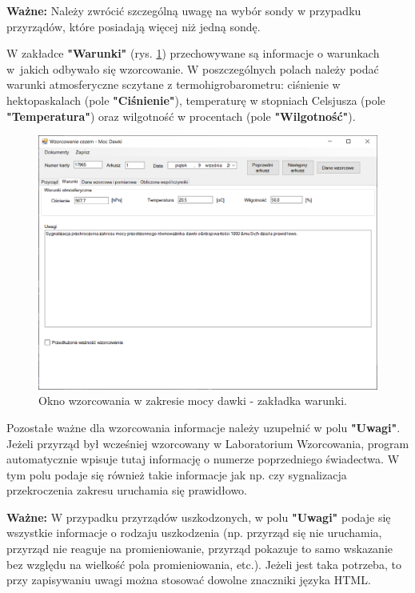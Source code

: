 \textbf{Ważne:} Należy zwrócić szczególną uwagę na wybór sondy w przypadku przyrządów, które posiadają więcej niż jedną sondę.

W zakładce \textbf{"Warunki"} (rys. \ref{mocWarunki}) przechowywane są informacje o warunkach w~jakich odbywało się wzorcowanie. W poszczególnych polach należy podać warunki atmosferyczne sczytane z termohigrobarometru: ciśnienie w hektopaskalach (pole \textbf{"Ciśnienie"}), temperaturę w stopniach Celsjusza (pole \textbf{"Temperatura"}) oraz wilgotność w procentach (pole \textbf{"Wilgotność"}).

\begin{figure}[htb]
	\centering
	\includegraphics[width=\columnwidth]{obrazki/Wzorcowanie/moc_dawki/warunki.png}
	\caption{Okno wzorcowania w zakresie mocy dawki - zakładka warunki.}
	\label{mocWarunki}
\end{figure}

Pozostałe ważne dla wzorcowania informacje należy uzupełnić w polu \textbf{"Uwagi"}. Jeżeli przyrząd był wcześniej wzorcowany w Laboratorium Wzorcowania, program automatycznie wpisuje tutaj informację o numerze poprzedniego świadectwa. W tym polu podaje się również takie informacje jak np. czy sygnalizacja przekroczenia zakresu uruchamia się prawidłowo. 

\textbf{Ważne:} W przypadku przyrządów uszkodzonych, w polu \textbf{"Uwagi"} podaje się wszystkie informacje o rodzaju uszkodzenia (np. przyrząd się nie uruchamia, przyrząd nie reaguje na promieniowanie, przyrząd pokazuje to samo wskazanie bez względu na wielkość pola promieniowania, etc.). Jeżeli jest taka potrzeba, to przy zapisywaniu uwagi można stosować dowolne znaczniki języka HTML.

